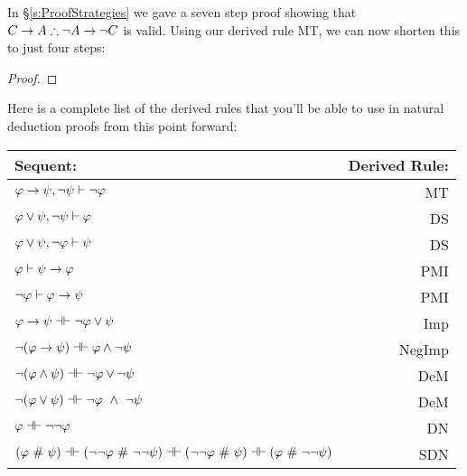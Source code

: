In  \S\ref{s:ProofStrategies} we gave a seven step proof showing that $C \rightarrow A \therefore \neg A \rightarrow \neg C$ is valid.  Using our derived rule MT, we can now shorten this to just four steps:

\begin{proof}
  
\open
	 
	 
\close
{} 
\end{proof}
Here is a complete list of the derived rules that you'll be able to use in natural deduction proofs from this point forward:

\begin{center}
\begin{tabular}{l  r}
\textbf{Sequent:}                    &       \textbf{Derived Rule:} \\ \hline
$\mathcal{\varphi} \rightarrow \mathcal{\psi},  \neg\mathcal{\psi} \vdash \neg \mathcal{\varphi}$   &                       MT  \\
$\mathcal{\varphi} \vee \mathcal{\psi},  \neg\mathcal{\psi} \vdash \mathcal{\varphi}$ & DS\\
$\mathcal{\varphi} \vee \mathcal{\psi},  \neg\mathcal{\varphi}\vdash \mathcal{\psi}$    &      DS  \\
$\mathcal{\varphi} \vdash\mathcal{\psi} \rightarrow \mathcal{\varphi}$  &              PMI  \\
$\neg\mathcal{\varphi}\vdash\mathcal{\varphi}\rightarrow \mathcal{\psi}$  & PMI\\
$\meta{\varphi} \rightarrow\meta{\psi} \pequiv \enot\meta{\varphi}\eor \meta{\psi}$  &                   Imp   \\
$\enot (\meta{\varphi} \rightarrow \meta{\psi}) \pequiv \meta{\varphi} \eand \enot \meta{\psi}$  &               NegImp  \\
$\enot (\meta{\varphi} \eand \meta{\psi})  \pequiv \enot\meta{\varphi}\eor \enot \meta{\psi}$  &                DeM  \\
$\enot (\meta{\varphi} \eor \meta{\psi}) \pequiv \enot\meta{\varphi}\ \eand \ \enot \meta{\psi}$   &               DeM  \\
$\meta{\varphi} \pequiv \enot \enot \meta{\varphi}$     &                              DN  \\
$(\meta{\varphi}  \ \#\  \meta{\psi}) \pequiv (\enot \enot \meta{\varphi}  \ \#\   \enot \enot \meta{\psi}) \pequiv (\enot \enot \meta{\varphi}  \ \#\  \meta{\psi}) \pequiv (\meta{\varphi}  \ \#\  \enot \enot  \meta{\psi})$ & SDN\\

\end{tabular}
\end{center}
